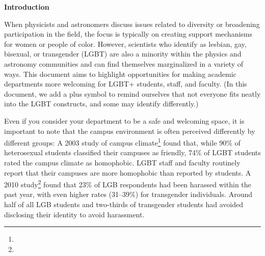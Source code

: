 \begin{titlepage}
\setcounter{page}{3}
\begin{center}


{\large{\textbf{Introduction}}}
\vspace*{\baselineskip}
\end{center}

When physicists and astronomers discuss issues related to diversity or broadening participation in the field, the focus is typically on creating support mechanisms for women or people of color.  However, scientists who identify as lesbian, gay, bisexual, or transgender (LGBT) are also a minority within the physics and astronomy communities and can find themselves marginalized in a variety of ways.  This document aims to highlight opportunities for making academic departments more welcoming for LGBT+ students, staff, and faculty.  (In this document, we add a plus symbol to remind ourselves that not everyone fits neatly into the LGBT constructs, and some may identify differently.) \vspace*{\baselineskip}

Even if you consider your department to be a safe and welcoming space, it is important to note that the campus environment is often perceived differently by different groups: A 2003 study of campus climate\footnote{} found that, while 90\% of heterosexual students classified their campuses as friendly, 74\% of LGBT students rated the campus climate as homophobic. LGBT staff and faculty routinely report that their campuses are more homophobic than reported by students. A 2010 study\footnote{} found that 23\% of LGB respondents had been harassed within the past year, with even higher rates (31--39\%) for transgender individuals. Around half of all LGB students and two-thirds of transgender students had avoided disclosing their identity to avoid harassment. \vspace*{\baselineskip}


\end{titlepage}

